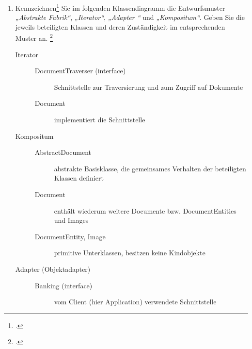 \documentclass{bschlangaul-aufgabe}
\begin{document}
\begin{enumerate}


\item Kennzeichnen\footcite{examen:66116:2016:03} Sie im folgenden
Klassendiagramm die Entwurfsmuster
\emph{„Abstrakte Fabrik“},
\emph{„Iterator“}, \emph{„Adapter
“} und \emph{„Kompositum“}.
Geben Sie die jeweils beteiligten Klassen und deren Zuständigkeit im
entsprechenden Muster an.
\footcite{sosy:ab:6}

\begin{bAntwort}

\begin{description}

%

\item[Iterator] \strut

\begin{description}
\item[DocumentTraverser (interface)]
Schnittstelle zur Traversierung und zum Zugriff auf Dokumente

\item[Document]
implementiert die Schnittstelle
\end{description}

%

\item[Kompositum] \strut

\begin{description}
\item[AbstractDocument]
abstrakte Basisklasse, die gemeinsames Verhalten der beteiligten
Klassen definiert

\item[Document]
enthält wiederum weitere Documente bzw. DocumentEntities und Images

\item[DocumentEntity, Image]
primitive Unterklassen, besitzen keine Kindobjekte
\end{description}

%

\item[Adapter (Objektadapter)] \strut

\begin{description}
\item[Banking (interface)]
vom Client (hier Application) verwendete Schnittstelle


\end{description}
\end{description}
\end{bAntwort}
\end{enumerate}
\end{document}
